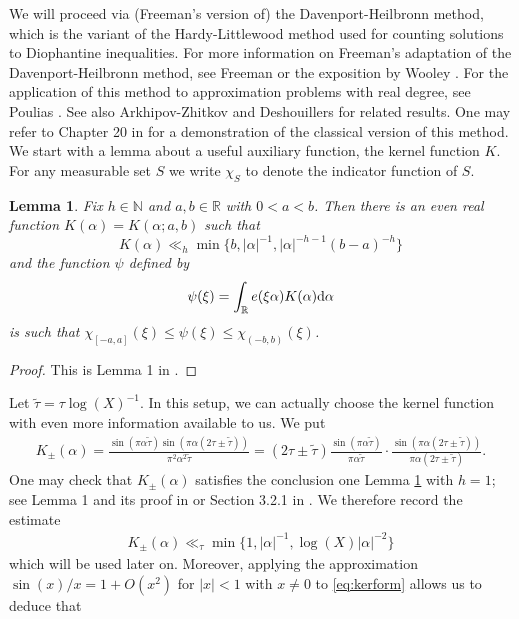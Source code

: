 \documentclass[11pt,reqno]{amsart}
\numberwithin{equation}{section}
\newtheorem{lemma}{Lemma}[section]
\begin{document}
We will proceed via (Freeman's version of) the Davenport-Heilbronn method, which is the variant of the Hardy-Littlewood method used for counting solutions to Diophantine inequalities. For more information on Freeman's adaptation of the Davenport-Heilbronn method, see Freeman \cite{FreemanLB, FreemanAsymp} or the exposition by Wooley \cite{WooleyDHF}. For the application of this method to approximation problems with real degree, see Poulias \cite{Poulias1, Poulthesis}. See also Arkhipov-Zhitkov \cite{ArkhZhit} and Deshouillers \cite{Des} for related results. One may refer to Chapter 20 in \cite{DavBook} for a demonstration of the classical version of this method.  
We start with a lemma about a useful auxiliary function, the kernel function $K$. For any measurable set $S$ we write $\chi_S$ to denote the indicator function of $S$. 
\begin{lemma} \label{lem:kernel} 
Fix $h \in \mathbb{N}$ and $a, b \in \mathbb{R}$ with $0 < a < b$. Then there is an even real function $K(\alpha) = K(\alpha;a,b)$ such that 
\[ K(\alpha) \ll_h \min \{b, |\alpha|^{-1}, |\alpha|^{-h-1}(b-a)^{-h} \} \]
and the function $\psi$ defined by 
\[ \psi(\xi) = \int_{\mathbb{R}} e(\xi\alpha)K(\alpha) \rm{d}\alpha \]
is such that $\chi_{[-a,a]}(\xi) \leq \psi(\xi) \leq \chi_{(-b,b)}(\xi) $.
\end{lemma}
\begin{proof} This is Lemma 1 in \cite{FreemanAsymp}. 
\end{proof} 
Let $\tilde{\tau} = \tau \log(X)^{-1}$. In this setup, we can actually choose the kernel function with even more information available to us. We put 
\begin{align} \label{eq:kerform}
K_{\pm}(\alpha) = \frac{\sin(\pi\alpha\tilde{\tau})\sin(\pi\alpha(2\tau\pm\tilde{\tau}))}{\pi^2 \alpha^2 \tilde{\tau}} = (2\tau\pm\tilde{\tau})\frac{\sin(\pi \alpha \tilde{\tau})}{\pi\alpha\tilde{\tau}} \cdot \frac{\sin(\pi\alpha(2\tau\pm \tilde{\tau}))}{\pi \alpha (2\tau\pm\tilde{\tau})} .
\end{align} 
One may check that $K_{\pm}(\alpha)$ satisfies the conclusion one Lemma \ref{lem:kernel} with $h = 1$; see Lemma 1 and its proof in \cite{FreemanAsymp} or Section 3.2.1 in \cite{Poulthesis}. 
We therefore record the estimate 
\begin{align} \label{eq:kerbound}
K_{\pm}(\alpha) \ll_{\tau} \min\{1, |\alpha|^{-1},\log(X)|\alpha|^{-2} \}
\end{align}
which will be used later on. Moreover, applying the approximation $\sin(x)/x = 1+O(x^2)$ for $|x| < 1$ with $x \neq 0$ to \eqref{eq:kerform} allows us to deduce that 
\end{document}
